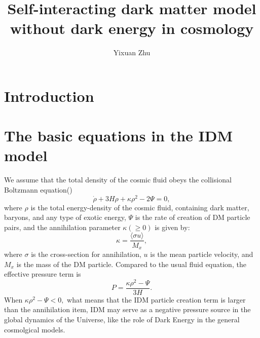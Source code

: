 \documentclass{aa}
\begin{document}
 

   \title{Self-interacting dark matter model without dark energy in cosmology}

   \author{Yixuan Zhu}


   \date{}
 
   \abstract{}
   
   \keywords{}

   \maketitle

\section{Introduction}

\section{The basic equations in the IDM model}

   We assume that the total density of the cosmic fluid obeys
   the collisional Boltzmann equation()
   \begin{equation}
      \dot{\rho}+3H\rho+\kappa\rho^2-2\Psi=0,
   \end{equation}
   where $\rho$ is the total energy-density of the cosmic fluid,
   containing dark matter, baryons, and any type of exotic energy,
   $\Psi$ is the rate of creation of DM particle pairs, and the
   annihilation parameter $\kappa(\geq0)$ is given by:
   \begin{equation}
      \kappa=\frac{\langle\sigma u\rangle}{M_x},\label{eq:2}
   \end{equation}
   where $\sigma$ is the cross-section for annihilation, $u$ is
   the mean particle velocity, and $M_x$ is the mass of the DM
   particle.
   Compared to the usual fluid equation, the effective pressure term
   is \begin{equation}
      P=\frac{\kappa\rho^2-\Psi}{3H}.
   \end{equation}
   When $\kappa\rho^2-\Psi<0,$ what means that the IDM particle
   creation term is larger than the annihilation item, IDM may serve
   as a negative pressure source in the global dynamics of the Universe,
   like the role of Dark Energy in the general cosmolgical models.
\end{document}

